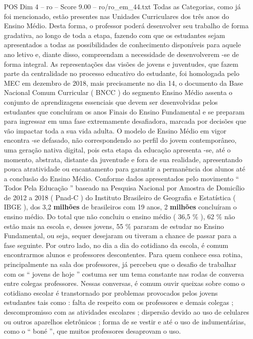 \begin{textsample}{POS Dim 4 – ro – Score 9.00 – ro/ro\_em\_44.txt}
Todas as Categorias, como já foi mencionado, estão presentes nas Unidades Curriculares dos três anos do Ensino Médio.
Desta forma, o professor poderá desenvolver seu trabalho de forma gradativa, ao longo de toda a etapa, fazendo com que os estudantes sejam apresentados a todas as possibilidades de conhecimento disponíveis para aquele ano letivo e, diante disso, compreendam a necessidade de desenvolverem -se de forma integral.
As representações das visões de jovens e juventudes, que fazem parte da centralidade no processo educativo do estudante, foi homologada pelo MEC em dezembro de 2018, mais precisamente no dia 14, o documento da Base Nacional Comum Curricular ( BNCC ) do segmento Ensino Médio assenta o conjunto de aprendizagens essenciais que devem ser desenvolvidas pelos estudantes que concluíram os anos Finais do Ensino Fundamental e se preparam para ingressar em uma fase extremamente desafiadora, marcada por decisões que vão impactar toda a sua vida adulta.
O modelo de Ensino Médio em vigor encontra -se defasado, não correspondendo ao perfil do jovem contemporâneo, uma geração nativa digital, pois esta etapa da educação apresenta -se, até o momento, abstrata, distante da juventude e fora de sua realidade, apresentando pouca atratividade ou encantamento para garantir a permanência dos alunos até a conclusão do Ensino Médio.
Conforme dados apresentados pelo movimento “ Todos Pela Educação ” baseado na Pesquisa Nacional por Amostra de Domicílio de 2012 a 2018 ( Pnad-C ) do Instituto Brasileiro de Geografia e Estatística ( IBGE ), dos 3,2 \textbf{milhões} de brasileiros com 19 anos, 2 \textbf{milhões} concluíram o ensino médio.
Do total que não concluiu o ensino médio ( 36,5 \% ), 62 \% não estão mais na escola e, desses jovens, 55 \% pararam de estudar no Ensino Fundamental, ou seja, sequer desejaram ou tiveram a chance de passar para a fase seguinte.
Por outro lado, no dia a dia do cotidiano da escola, é comum encontrarmos alunos e professores descontentes.
Para quem conhece essa rotina, principalmente na sala dos professores, já percebeu que o desafio de trabalhar com os “ jovens de hoje ” costuma ser um tema constante nas rodas de conversa entre colegas professores.
Nessas conversas, é comum ouvir queixas sobre como o cotidiano escolar é transtornado por problemas provocados pelos jovens estudantes tais como : falta de respeito com os professores e demais colegas ; descompromisso com as atividades escolares ; dispersão devido ao uso de celulares ou outros aparelhos eletrônicos ; forma de se vestir e até o uso de indumentárias, como o “ boné ”, que muitos professores desaprovam o uso.

\end{textsample}
